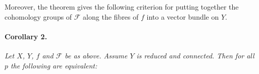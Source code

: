 Moreover, the theorem gives the following criterion for putting together
the cohomology groups of $\mathcal{F}$ along the fibres of $f$ into a
vector bundle on $Y$.

\paragraph{Corollary 2.}
\textit{Let $X$, $Y$, $f$ and $\mathcal{F}$ be as above. Assume $Y$ is
reduced and connected. Then for all $p$ the following are equivalent:}
